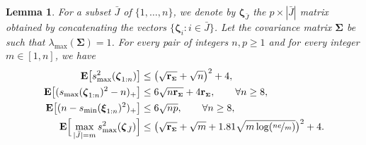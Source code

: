 \documentclass[aos,preprint,reqno]{imsart}
\newcommand\bxi{\boldsymbol\xi}
\newcommand\bzeta{\boldsymbol\zeta}
\newcommand\bSigma{\boldsymbol\Sigma}
\newcommand\bfE{\mathbf E}
\newcommand\rSigma{\textbf{\textup{r}}_{\scriptscriptstyle\bSigma}}
\theoremstyle{plain}
\newtheorem{lemma}{Lemma}
\theoremstyle{remark}
\begin{document}
	\begin{lemma} \label{lem:smax}
	For a subset $\bar J$ of $\{1,\ldots,n\}$, we denote by $\bzeta_{\bar J}$ the 
	$p\times |\bar J|$ matrix obtained by concatenating the vectors 
	$\{\bzeta_i: i\in\bar J\}$. Let the covariance matrix $\bSigma$ be such that 
	$\lambda_{\max}(\bSigma) =1$. For every pair of integers  $n,p\ge 1$ and for 
	every integer $m\in[1,n]$, we have
	\begin{align}
		\bfE\big[s_{\max}^2(\bzeta_{1:n})\big] &\le  \big(\sqrt{\rSigma} + 
		\sqrt{n}\big)^2 +4,\label{esp:1}\\
		\bfE\big[(s_{\max}(\bzeta_{1:n})^2-n)_+\big]			
			&\le 6\sqrt{n\rSigma} + 4\rSigma,\qquad \forall n\ge 8,\label{esp:1b}\\
		\bfE\big[(n-s_{\min}(\bxi_{1:n})^2)_+\big]			
			&\le 6\sqrt{np},\qquad \forall n\ge 8,\label{esp:1c}\\
		\bfE\Big[\max_{|\bar J| = m} s_{\max}^2(\bzeta_{\bar J})\Big] &\le
				\big(\sqrt{\rSigma} + \sqrt{m} +  1.81\sqrt{m \log(\nicefrac{ne}{m})}\big)^2
				+4\label{esp:2}.
	\end{align}	
	\end{lemma} 
\end{document}
